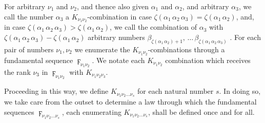 \documentclass{amsart}
\newcommand\Max[1]{\zeta\left(#1\right)}
\begin{document}
For arbitrary $\nu_1$ and $\nu_2$, and thence also given $\alpha_1$ and
$\alpha_2$, and arbitrary $\alpha_3$, we call the number $\alpha_3$ a
$K_{\nu_1\nu_2}$-combination in case $\Max{\alpha_1\,\alpha_2\,\alpha_3} =
\Max{\alpha_1\,\alpha_2}$, and, in case $\Max{\alpha_1\,\alpha_2\,\alpha_3} >
\Max{\alpha_1\,\alpha_2}$, we  call the combination of
$\alpha_3$ with $\Max{\alpha_1\,\alpha_2\,\alpha_3} - \Max{\alpha_1\,\alpha_2}$
arbitrary numbers $\beta_{\Max{\alpha_1\,\alpha_2} +
1},\,\dots\,\beta_{\Max{\alpha_1\,\alpha_2\,\alpha_3}}$ . For each pair of numbers $\nu_1, \nu_2$ we
enumerate the $K_{\nu_1\nu_2}$-combinations through a fundamental sequence
$\digamma_{\nu_1\nu_2}$. We notate each $K_{\nu_1\nu_2}$ combination which
receives the rank $\nu_3$ in $\digamma_{\nu_1\nu_2}$ with
$K_{\nu_1\nu_2\nu_3}$.

Proceeding in this way, we define $K_{\nu_1\nu_2\dots\nu_s}$ for each natural
number $s$. In doing so, we take care from the outset to determine a
law through which the fundamental sequences $\digamma_{\nu_1\nu_2\dots\nu_s}$,
each enumerating $K_{\nu_1\nu_2\dots\nu_s}$, shall be defined once and for all.
\end{document}
